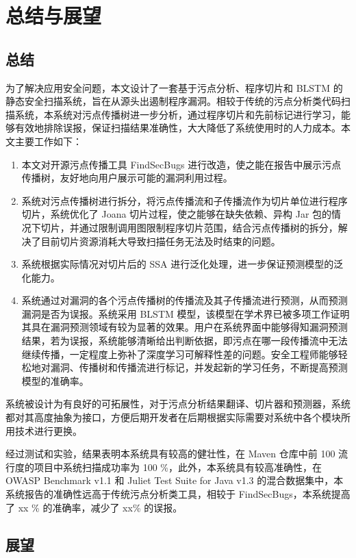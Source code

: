 \chapter{总结与展望}
\section{总结}
为了解决应用安全问题，本文设计了一套基于污点分析、程序切片和 BLSTM 的静态安全扫描系统，旨在从源头出遏制程序漏洞。相较于传统的污点分析类代码扫描系统，本系统对污点传播树进一步分析，通过程序切片和先前标记进行学习，能够有效地排除误报，保证扫描结果准确性，大大降低了系统使用时的人力成本。本文主要工作如下：


\begin{enumerate}
    \item 本文对开源污点传播工具 FindSecBugs 进行改造，使之能在报告中展示污点传播树，友好地向用户展示可能的漏洞利用过程。
    \item 系统对污点传播树进行拆分，将污点传播流和子传播流作为切片单位进行程序切片，系统优化了 Joana 切片过程，使之能够在缺失依赖、异构 Jar 包的情况下切片，并通过限制调用图限制程序切片范围，结合污点传播树的拆分，解决了目前切片资源消耗大导致扫描任务无法及时结束的问题。
    \item 系统根据实际情况对切片后的 SSA 进行泛化处理，进一步保证预测模型的泛化能力。
    \item 系统通过对漏洞的各个污点传播树的传播流及其子传播流进行预测，从而预测漏洞是否为误报。系统采用 BLSTM 模型，该模型在学术界已被多项工作证明其具在漏洞预测领域有较为显著的效果。用户在系统界面中能够得知漏洞预测结果，若为误报，系统能够清晰给出判断依据，即污点在哪一段传播流中无法继续传播，一定程度上弥补了深度学习可解释性差的问题。安全工程师能够轻松地对漏洞、传播树和传播流进行标记，并发起新的学习任务，不断提高预测模型的准确率。
\end{enumerate}

系统被设计为有良好的可拓展性，对于污点分析结果翻译、切片器和预测器，系统都对其高度抽象为接口，方便后期开发者在后期根据实际需要对系统中各个模块所用技术进行更换。

经过测试和实验，结果表明本系统具有较高的健壮性，在 Maven 仓库中前 100 流行度的项目中系统扫描成功率为 100 \%，此外，本系统具有较高准确性，在 OWASP Benchmark v1.1 和 Juliet Test Suite for Java v1.3 的混合数据集中，本系统报告的准确性远高于传统污点分析类工具，相较于 FindSecBugs，本系统提高了 xx \% 的准确率，减少了 xx\% 的误报。

\section{展望}

